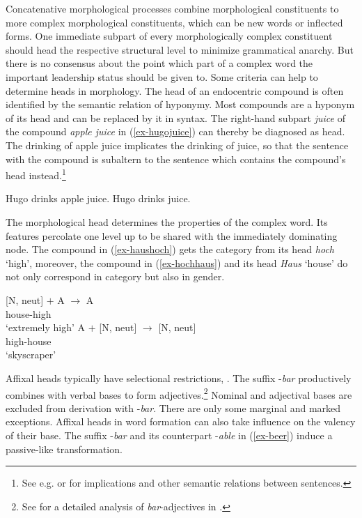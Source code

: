 \documentclass[output=paper
  ,nobabel
  ,draftmode
  ,colorlinks, citecolor=brown
]{langscibook}
\begin{document}
Concatenative morphological processes combine morphological constituents to more complex morphological constituents, which can be new words or inflected forms. One immediate subpart of every morphologically complex constituent should head the respective structural level to minimize grammatical anarchy. But there is no consensus about the point which part of a complex word the important leadership status should be given to. Some criteria can help to determine heads in morphology. The head of an endocentric compound is often identified by the semantic relation of hyponymy. Most compounds are a hyponym of its head and can be replaced by it in syntax. The right-hand subpart \emph{juice} of the  compound \emph{apple juice} in (\ref{ex-hugojuice}) can thereby be diagnosed as head. The drinking of apple juice implicates the drinking of juice, so that the sentence with the compound is subaltern to the sentence which contains the compound's head instead.\footnote{See e.g. \citet[Section~4.3]{Loebner2003} or \citet[Section~5.2]{SchwarzChur2001} for implications and other semantic relations between sentences.}

\eal
\ex\label{ex-hugojuice} Hugo drinks apple juice.
\ex Hugo drinks juice.
\zl

\noindent The morphological head determines the properties of the complex word. Its features percolate one level up to be shared with the immediately dominating node. The compound in (\ref{ex-haushoch}) gets the category from its head \emph{hoch} `high', moreover, the compound in (\ref{ex-hochhaus}) and its head \emph{Haus} `house' do not only correspond in category but also in gender.

\eal
\ex\label{ex-haushoch}
 \hspace{20pt} [N, neut] $+$ A $\rightarrow$ A \\
house-high\\
`extremely high'
\ex\label{ex-hochhaus}
 \hspace{20pt} A $+$ [N, neut] $\rightarrow$ [N, neut]\\
high-house \\
`skyscraper'
\zl

\noindent Affixal heads typically have selectional restrictions, \citep[cf.][77]{Hoehle1982}. The  suffix -\emph{bar} productively combines with verbal bases to form adjectives.\footnote{See \citet{Riehemann1998} for a detailed analysis of \emph{bar}-adjectives in .} Nominal and adjectival bases are excluded from derivation with -\emph{bar}. There are only some marginal and marked exceptions. Affixal heads in word formation can also take influence on the valency of their base. The  suffix -\emph{bar} and its  counterpart -\emph{able} in (\ref{ex-beer}) induce a passive-like transformation.
\end{document}
